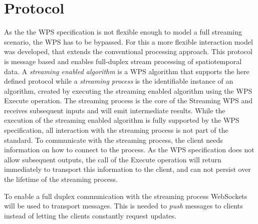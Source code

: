 \section{Protocol}
	As the the \ac{WPS} specification is not flexible enough to model a full streaming scenario, the \ac{WPS} has to be bypassed. For this a more flexible interaction model was developed, that extends the conventional processing approach. This protocol is message based and enables full-duplex stream processing of spatiotemporal data. A \emph{streaming enabled algorithm} is a \ac{WPS} algorithm that supports the here defined protocol while a \emph{streaming process} is the identifiable instance of an algorithm, created by executing the streaming enabled algorithm using the \ac{WPS} Execute operation. The streaming process is the core of the Streaming \ac{WPS} and receives subsequent inputs and will emit intermediate results. While the execution of the streaming enabled algorithm is fully supported by the \ac{WPS} specification, all interaction with the streaming process is not part of the standard. To communicate with the streaming process, the client needs information on how to connect to the process. As the \ac{WPS} specification does not allow subsequent outputs, the call of the Execute operation will return immediately to transport this information to the client, and can not persist over the lifetime of the streaming process.

	To enable a full duplex communication with the streaming process WebSockets will be used to transport messages. This is needed to \emph{push} messages to clients instead of letting the clients constantly request updates.

